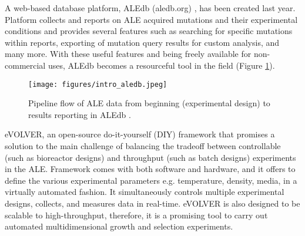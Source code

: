 A web-based database platform, ALEdb (aledb.org) \cite{phaneuf2019aledb}, has been created last year. Platform collects and reports on ALE acquired mutations and their experimental conditions and provides several features such as searching for specific mutations within reports, exporting of mutation query results for custom analysis, and many more. With these useful features and being freely available for non-commercial uses, ALEdb becomes a resourceful tool in the field (Figure \ref{fig:intro_aledb}).
\vspace{0.5cm}
  \begin{figure}[H]
  \begin{center}
  \texttt{[image: figures/intro\_aledb.jpeg]}
  \caption[Pipeline flow of ALE data from beginning (experimental design) to results reporting in ALEdb \cite{phaneuf2019aledb}.]{Pipeline flow of ALE data from beginning (experimental design) to results reporting in ALEdb \cite{phaneuf2019aledb}.}
  \label{fig:intro_aledb}
  \end{center}
\end{figure}
\vspace{-1cm}
eVOLVER\cite{wong2018precise}, an open-source do-it-yourself (DIY) framework that promises a solution to the main challenge of balancing the tradeoff between controllable (such as bioreactor designs) and throughput (such as batch designs) experiments in the ALE. Framework comes with both software and hardware, and it offers to define the various experimental parameters e.g. temperature, density, media, in a virtually automated fashion. It simultaneously controls multiple experimental designs, collects, and measures data in real-time. eVOLVER is also designed to be scalable to high-throughput, therefore, it is a promising tool to carry out automated multidimensional growth and selection experiments.


